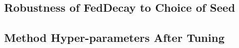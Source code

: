 \documentclass[12pt]{article}
\begin{document}
        \subsection{Robustness of FedDecay to Choice of Seed}
        \label{app: decay-app-seed}
        

        \subsection{Method Hyper-parameters After Tuning}
        \label{app: decay-app-params}
        
\end{document}
